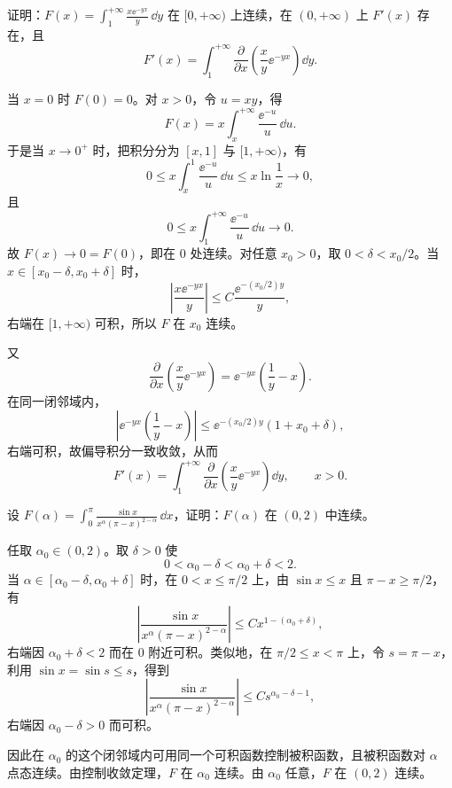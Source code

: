 \begin{xexercise}[4]
证明：$F(x)=\displaystyle\int_1^{+\infty}\frac{x\ee^{-yx}}{y}\,\dd y$ 在 $[0,+\infty)$ 上连续，在 $(0,+\infty)$ 上 $F'(x)$ 存在，且
  \[
    F'(x)=\int_1^{+\infty}\frac{\partial}{\partial x}\left(\frac{x}{y}\ee^{-yx}\right)\dd y.
  \]
\end{xexercise}
\begin{xsolution}
当 $x=0$ 时 $F(0)=0$。对 $x>0$，令 $u=xy$，得
\[
F(x)=x\int_x^{+\infty}\frac{\ee^{-u}}u\,\dd u.
\]
于是当 $x\to0^+$ 时，把积分分为 $[x,1]$ 与 $[1,+\infty)$，有
\[
0\leqslant x\int_x^1\frac{\ee^{-u}}u\,\dd u
\leqslant x\ln\frac1x\to0,
\]
且
\[
0\leqslant x\int_1^{+\infty}\frac{\ee^{-u}}u\,\dd u\to0.
\]
故 $F(x)\to0=F(0)$，即在 $0$ 处连续。对任意 $x_0>0$，取 $0<\delta<x_0/2$。当 $x\in[x_0-\delta,x_0+\delta]$ 时，
\[
\left|\frac{x\ee^{-yx}}y\right|
\leqslant C\frac{\ee^{-(x_0/2)y}}y,
\]
右端在 $[1,+\infty)$ 可积，所以 $F$ 在 $x_0$ 连续。

又
\[
\frac{\partial}{\partial x}\left(\frac{x}{y}\ee^{-yx}\right)
=\ee^{-yx}\left(\frac1y-x\right).
\]
在同一闭邻域内，
\[
\left|\ee^{-yx}\left(\frac1y-x\right)\right|
\leqslant \ee^{-(x_0/2)y}\left(1+x_0+\delta\right),
\]
右端可积，故偏导积分一致收敛，从而
\[
\boxed{
F'(x)=\int_1^{+\infty}
\frac{\partial}{\partial x}\left(\frac{x}{y}\ee^{-yx}\right)\dd y,
\qquad x>0.}
\]
\end{xsolution}


\begin{xexercise}[5]
设 $F(\alpha)=\displaystyle\int_0^\pi\frac{\sin x}{x^\alpha(\pi-x)^{2-\alpha}}\,\dd x$，证明：$F(\alpha)$ 在 $(0,2)$ 中连续。
\end{xexercise}
\begin{xsolution}
任取 $\alpha_0\in(0,2)$。取 $\delta>0$ 使
\[
0<\alpha_0-\delta<\alpha_0+\delta<2.
\]
当 $\alpha\in[\alpha_0-\delta,\alpha_0+\delta]$ 时，在 $0<x\leqslant\pi/2$ 上，由 $\sin x\leqslant x$ 且 $\pi-x\geqslant\pi/2$，有
\[
\left|\frac{\sin x}{x^\alpha(\pi-x)^{2-\alpha}}\right|
\leqslant Cx^{1-(\alpha_0+\delta)},
\]
右端因 $\alpha_0+\delta<2$ 而在 $0$ 附近可积。类似地，在 $\pi/2\leqslant x<\pi$ 上，令 $s=\pi-x$，利用 $\sin x=\sin s\leqslant s$，得到
\[
\left|\frac{\sin x}{x^\alpha(\pi-x)^{2-\alpha}}\right|
\leqslant Cs^{\alpha_0-\delta-1},
\]
右端因 $\alpha_0-\delta>0$ 而可积。

因此在 $\alpha_0$ 的这个闭邻域内可用同一个可积函数控制被积函数，且被积函数对 $\alpha$ 点态连续。由控制收敛定理，$F$ 在 $\alpha_0$ 连续。由 $\alpha_0$ 任意，$F$ 在 $(0,2)$ 连续。
\end{xsolution}


